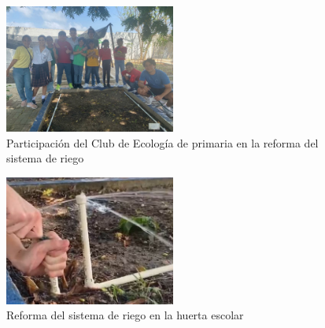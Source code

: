 \documentclass[12pt]{article}
\begin{document}
\begin{figure}[h!]
      \centering
      \includegraphics[width=0.5\textwidth]{imagenes/actividad2.jpg}
      \caption{Participación del Club de Ecología de primaria en la reforma del sistema de riego}
      \label{fig:actividad2}
\end{figure}

\begin{figure}[h!]
      \centering
      \includegraphics[width=0.5\textwidth]{imagenes/sprinkler.jpg}
      \caption{Reforma del sistema de riego en la huerta escolar}
      \label{fig:sprinkler}
\end{figure}
\end{document}
